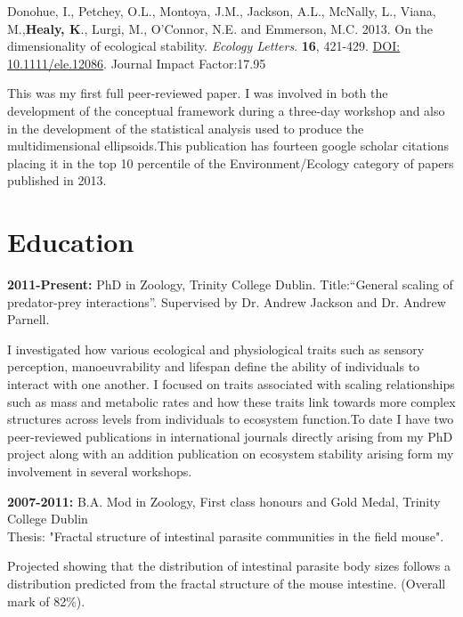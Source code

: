 \documentclass[10pt,a4paper]{article}
\begin{document}
\begin{flushleft}
\setlength{\parindent}{0mm}Donohue, I., Petchey, O.L., Montoya, J.M., Jackson, A.L., McNally, L., Viana, M.,\textbf{Healy, K}., Lurgi, M., O’Connor, N.E. and Emmerson, M.C. 2013. On the dimensionality of ecological stability. \textit{Ecology Letters}. \textbf{16}, 421-429. \href{http://onlinelibrary.wiley.com/doi/10.1111/ele.12086/abstract}{DOI: 10.1111/ele.12086}.  Journal Impact Factor:17.95\\
\smallskip
\par{\fontsize{10.5}{10}\selectfont This was my first full peer-reviewed paper. I was involved in both the development of the conceptual framework during a three-day workshop and also in the development of the statistical analysis used to produce the multidimensional ellipsoids.This publication has fourteen google scholar citations placing it in the top 10 percentile of the Environment/Ecology category of papers published in 2013.}
\end{flushleft}


\section{Education}

\raggedright	
\textbf{2011-Present:} PhD in Zoology, Trinity College Dublin. Title:“General scaling of predator-prey interactions”. Supervised by Dr. Andrew Jackson and Dr. Andrew Parnell. \smallskip
\par{\fontsize{10.5}{10}\selectfont I investigated how various ecological and physiological traits such as sensory perception, manoeuvrability and lifespan define the ability of individuals to interact with one another. I focused on traits associated with scaling relationships such as mass and metabolic rates and how these traits link towards more complex structures across levels from individuals to ecosystem function.To date I have two peer-reviewed publications in international journals directly arising from my PhD project along with an addition publication on ecosystem stability arising form my involvement in several workshops.\bigskip}


\textbf{2007-2011:} B.A. Mod in Zoology, First class honours and Gold Medal, Trinity College Dublin\\
Thesis: "Fractal structure of intestinal parasite communities in the field mouse".\\
\par{\fontsize{10.5}{10}\selectfont Projected showing that the distribution of intestinal parasite body sizes follows a distribution predicted from the fractal structure of the mouse intestine. (Overall mark of 82\%).\bigskip}
\end{document}
